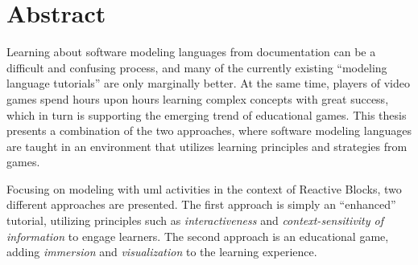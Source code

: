 \chapter*{Abstract}
Learning about software modeling languages from documentation can be a difficult and confusing process, and many of the currently existing ``modeling language tutorials'' are only marginally better. At the same time, players of video games spend hours upon hours learning complex concepts with great success, which in turn is supporting the emerging trend of educational games. This thesis presents a combination of the two approaches, where software modeling languages are taught in an environment that utilizes learning principles and strategies from games.

\noindent
Focusing on modeling with \gls{uml} activities in the context of Reactive Blocks, two different approaches are presented. The first approach is simply an ``enhanced'' tutorial, utilizing principles such as \emph{interactiveness} and \emph{context-sensitivity of information} to engage learners. The second approach is an educational game, adding \emph{immersion} and \emph{visualization} to the learning experience.
